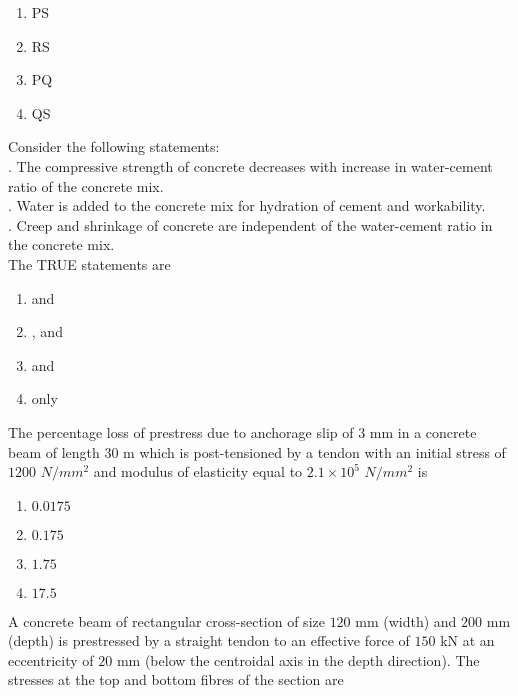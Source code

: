 \begin{enumerate}
	\item PS
	\item RS
	\item PQ
	\item QS\\
\end{enumerate}
        \item Consider the following statements:\\
	\uppercase\expandafter{}. The compressive strength of concrete decreases with increase in water-cement ratio of the concrete mix.\\
	\uppercase\expandafter{}. Water is added to the concrete mix for hydration of cement and workability.\\
	\uppercase\expandafter{}. Creep and shrinkage of concrete are independent of the water-cement ratio in the concrete mix.\\
	The TRUE statements are
	\begin{enumerate}
		\item \uppercase\expandafter{} and \uppercase\expandafter{}
		\item \uppercase\expandafter{},\uppercase\expandafter{} and \uppercase\expandafter{}
		\item \uppercase\expandafter{} and \uppercase\expandafter{}
		\item only \uppercase\expandafter{}\\
	\end{enumerate}
            \item The percentage loss of prestress due to anchorage slip of $3$ mm in a concrete beam of length $30$ m which is post-tensioned by a tendon with an initial stress of $1200$ $N/mm^2$ and modulus of elasticity equal to $2.1\times{10}^{5}$ $N/mm^2$ is 
		    \begin{enumerate}
			    \item $0.0175$
			    \item $0.175$
			    \item $1.75$
			    \item $17.5$\\
		    \end{enumerate}
	    \item A concrete beam of rectangular cross-section of size $120$ mm (width) and $200$ mm (depth) is prestressed by a straight tendon to an effective force of $150$ kN at an eccentricity of $20$ mm (below the centroidal axis in the depth direction). The stresses at the top and bottom fibres of the section are
